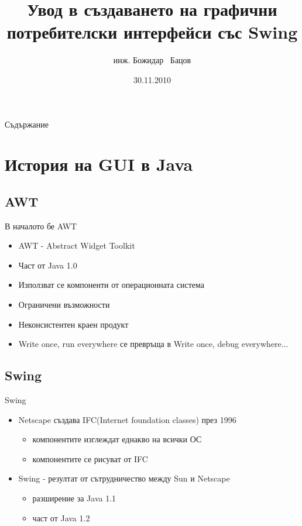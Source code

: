 \documentclass{beamer}
\title{Увод в създаването на графични потребителски интерфейси със Swing}
\author{инж. Божидар ~Бацов}
\institute{Drow Ltd.}
\date{30.11.2010}
\begin{document}
\begin{frame}
  \titlepage
\end{frame}

\begin{frame}{Съдържание}
  \transdissolve
  \tableofcontents[pausesections]
\end{frame}

\section{История на GUI в Java}

\subsection{AWT}

\begin{frame}{В началото бе AWT}
  \transdissolve
  \begin{itemize}
  \item AWT - Abstract Widget Toolkit
  \item Част от Java 1.0
  \item Използват се компоненти от операционната система
  \item Ограничени възможности
  \item Неконсистентен краен продукт
  \item Write once, run everywhere се превръща в Write once, debug everywhere...
  \end{itemize}
\end{frame}

\subsection{Swing}
\begin{frame}{Swing}
  \transdissolve
  \begin{itemize}
  \item Netscape създава IFC(Internet foundation classes) през 1996
    \begin{itemize}
      \item компонентите изглеждат еднакво на всички ОС
      \item компонентите се рисуват от IFC
    \end{itemize}
  \item Swing - резултат от сътрудничество между Sun и Netscape
    \begin{itemize}
      \item разширение за Java 1.1
      \item част от Java 1.2
    \end{itemize}

  \end{itemize}
\end{frame}
\end{document}
